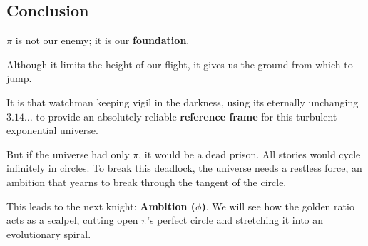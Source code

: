 \subsection{Conclusion}

$\pi$ is not our enemy; it is our \textbf{foundation}.

Although it limits the height of our flight, it gives us the ground from which to jump.

It is that watchman keeping vigil in the darkness, using its eternally unchanging $3.14\ldots$ to provide an absolutely reliable \textbf{reference frame} for this turbulent exponential universe.

But if the universe had only $\pi$, it would be a dead prison. All stories would cycle infinitely in circles. To break this deadlock, the universe needs a restless force, an ambition that yearns to break through the tangent of the circle.

This leads to the next knight: \textbf{Ambition ($\phi$)}. We will see how the golden ratio acts as a scalpel, cutting open $\pi$'s perfect circle and stretching it into an evolutionary spiral.

